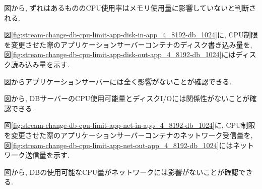 \documentclass[../../../../main]{subfiles}
\begin{document}
    

    図から, ずれはあるもののCPU使用率はメモリ使用量に影響していないと判断される.


    図\ref{fig:stream-change-db-cpu-limit-app-disk-in-app_4_8192-db_1024}に, CPU制限を変更させた際のアプリケーションサーバーコンテナのディスク書き込み量を, 図\ref{fig:stream-change-db-cpu-limit-app-disk-out-app_4_8192-db_1024}にはディスク読み込み量を示す.

    
    

    図からアプリケーションサーバーには全く影響がないことが確認できる.

    
    

    図から, DBサーバーのCPU使用可能量とディスクI/Oには関係性がないことが確認できる.


    図\ref{fig:stream-change-db-cpu-limit-app-net-in-app_4_8192-db_1024}に, CPU制限を変更させた際のアプリケーションサーバーコンテナのネットワーク受信量を, 図\ref{fig:stream-change-db-cpu-limit-app-net-out-app_4_8192-db_1024}にはネットワーク送信量を示す.

    
    

    図から, DBの使用可能なCPU量がネットワークには影響がないことが確認できる.
\end{document}
